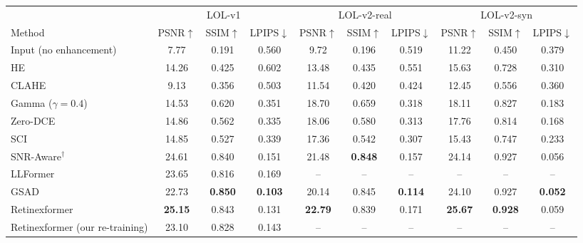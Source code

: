 \begin{tabular}{l ccc ccc ccc}
\toprule
 & \multicolumn{3}{c}{LOL-v1} & \multicolumn{3}{c}{LOL-v2-real} & \multicolumn{3}{c}{LOL-v2-syn} \\
\cmidrule(lr){2-4}\cmidrule(lr){5-7}\cmidrule(lr){8-10}
Method & PSNR$\uparrow$ & SSIM$\uparrow$ & LPIPS$\downarrow$ & PSNR$\uparrow$ & SSIM$\uparrow$ & LPIPS$\downarrow$ & PSNR$\uparrow$ & SSIM$\uparrow$ & LPIPS$\downarrow$ \\
\midrule
Input (no enhancement) & 7.77 & 0.191 & 0.560 & 9.72 & 0.196 & 0.519 & 11.22 & 0.450 & 0.379 \\
HE & 14.26 & 0.425 & 0.602 & 13.48 & 0.435 & 0.551 & 15.63 & 0.728 & 0.310 \\
CLAHE & 9.13 & 0.356 & 0.503 & 11.54 & 0.420 & 0.424 & 12.45 & 0.556 & 0.360 \\
Gamma ($\gamma{=}0.4$) & 14.53 & 0.620 & 0.351 & 18.70 & 0.659 & 0.318 & 18.11 & 0.827 & 0.183 \\
\midrule
Zero-DCE~\cite{guo2020zerodce} & 14.86 & 0.562 & 0.335 & 18.06 & 0.580 & 0.313 & 17.76 & 0.814 & 0.168 \\
SCI~\cite{ma2022sci} & 14.85 & 0.527 & 0.339 & 17.36 & 0.542 & 0.307 & 15.43 & 0.747 & 0.233 \\
\midrule
SNR-Aware$^{\dagger}$~\cite{xu2022snr} & 24.61 & 0.840 & 0.151 & 21.48 & \textbf{0.848} & 0.157 & 24.14 & 0.927 & 0.056 \\
LLFormer~\cite{wang2023llformer} & 23.65 & 0.816 & 0.169 & -- & -- & -- & -- & -- & -- \\
GSAD~\cite{hou2023gsad} & 22.73 & \textbf{0.850} & \textbf{0.103} & 20.14 & 0.845 & \textbf{0.114} & 24.10 & 0.927 & \textbf{0.052} \\
Retinexformer~\cite{cai2023retinexformer} & \textbf{25.15} & 0.843 & 0.131 & \textbf{22.79} & 0.839 & 0.171 & \textbf{25.67} & \textbf{0.928} & 0.059 \\
Retinexformer (our re-training) & 23.10 & 0.828 & 0.143 & -- & -- & -- & -- & -- & -- \\
\bottomrule
\end{tabular}
